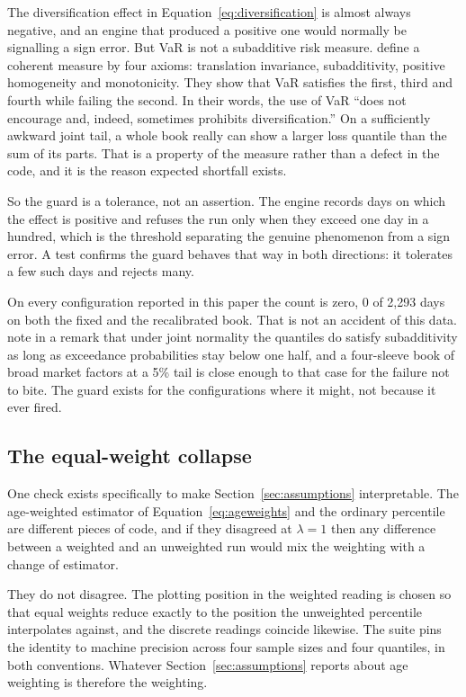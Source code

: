 The diversification effect in Equation~\eqref{eq:diversification} is almost
always negative, and an engine that produced a positive one would normally be
signalling a sign error. But VaR is not a subadditive risk measure.
\citet{artzner1999coherent} define a coherent measure by four axioms:
translation invariance, subadditivity, positive homogeneity and monotonicity.
They show that VaR satisfies the first, third and fourth while failing the
second. In their words, the use of VaR ``does not encourage and, indeed,
sometimes prohibits diversification.'' On a sufficiently awkward joint tail, a
whole book really can show a larger loss quantile than the sum of its parts.
That is a property of the measure rather than a defect in the code, and it is
the reason expected shortfall exists.

So the guard is a tolerance, not an assertion. The engine records days on which
the effect is positive and refuses the run only when they exceed one day in a
hundred, which is the threshold separating the genuine phenomenon from a sign
error. A test confirms the guard behaves that way in both directions: it
tolerates a few such days and rejects many.

On every configuration reported in this paper the count is zero, 0 of 2{,}293
days on both the fixed and the recalibrated book. That is not an accident of
this data. \citet{artzner1999coherent} note in a remark that under joint
normality the quantiles do satisfy subadditivity as long as exceedance
probabilities stay below one half, and a four-sleeve book of broad market
factors at a 5\% tail is close enough to that case for the failure not to bite.
The guard exists for the configurations where it might, not because it ever
fired.

\subsection{The equal-weight collapse}

One check exists specifically to make Section~\ref{sec:assumptions}
interpretable. The age-weighted estimator of
Equation~\eqref{eq:ageweights} and the ordinary percentile are different pieces
of code, and if they disagreed at $\lambda = 1$ then any difference between a
weighted and an unweighted run would mix the weighting with a change of
estimator.

They do not disagree. The plotting position in the weighted reading is chosen so
that equal weights reduce exactly to the position the unweighted percentile
interpolates against, and the discrete readings coincide likewise. The suite
pins the identity to machine precision across four sample sizes and four
quantiles, in both conventions. Whatever Section~\ref{sec:assumptions} reports
about age weighting is therefore the weighting.

